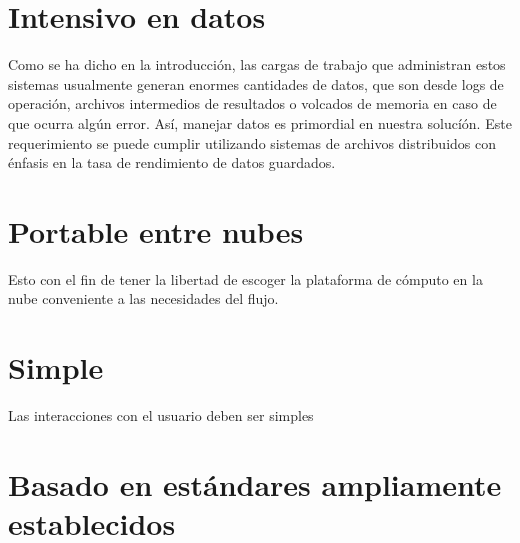\section{Intensivo en datos}

Como se ha dicho en la introducción, las cargas de trabajo que administran estos sistemas usualmente generan enormes cantidades de datos, que son desde logs de operación, archivos intermedios de resultados o volcados de memoria en caso de que ocurra algún error. Así, manejar datos es primordial en nuestra solucíón. Este requerimiento se puede cumplir utilizando sistemas de archivos distribuidos con énfasis en la tasa de rendimiento de datos guardados.


\section{Portable entre nubes}

Esto con el fin de tener la libertad de escoger la plataforma de cómputo en la nube conveniente a las necesidades del flujo.


\section{Simple}

Las interacciones con el usuario deben ser simples



\section{Basado en estándares ampliamente establecidos}
